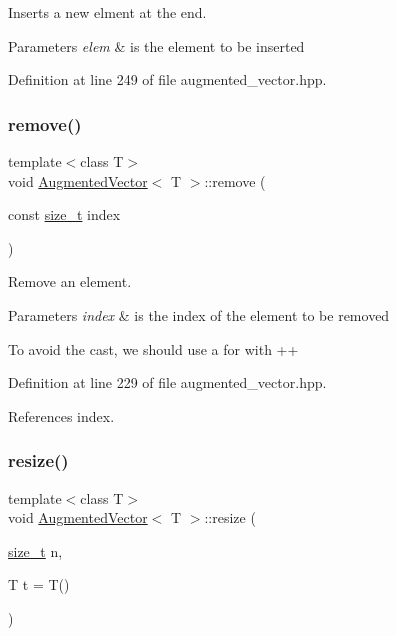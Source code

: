 Inserts a new elment at the end. 


\begin{DoxyParams}{Parameters}
{\em elem} & is the element to be inserted \\
\hline
\end{DoxyParams}


Definition at line 249 of file augmented\+\_\+vector.\+hpp.

\mbox{\label{classAugmentedVector_aaab0ba673a617c1641ce90c9f92d1f0f}} 
\subsubsection{\texorpdfstring{remove()}{remove()}}
{\footnotesize\ttfamily template$<$class T$>$ \\
void \hyperlink{classAugmentedVector}{Augmented\+Vector}$<$ T $>$\+::remove (\begin{DoxyParamCaption}\item[{const \hyperlink{tutorial__fpt__2017_2intro_2sixth_2test_8c_a7c94ea6f8948649f8d181ae55911eeaf}{size\+\_\+t}}]{index }\end{DoxyParamCaption})\hspace{0.3cm}{\ttfamily [inline]}}



Remove an element. 


\begin{DoxyParams}{Parameters}
{\em index} & is the index of the element to be removed \\
\hline
\end{DoxyParams}
To avoid the cast, we should use a for with ++ 

Definition at line 229 of file augmented\+\_\+vector.\+hpp.



References index.

\mbox{\label{classAugmentedVector_ac7bda0c6b6794fd34869116dc5e5538b}} 
\subsubsection{\texorpdfstring{resize()}{resize()}}
{\footnotesize\ttfamily template$<$class T$>$ \\
void \hyperlink{classAugmentedVector}{Augmented\+Vector}$<$ T $>$\+::resize (\begin{DoxyParamCaption}\item[{\hyperlink{tutorial__fpt__2017_2intro_2sixth_2test_8c_a7c94ea6f8948649f8d181ae55911eeaf}{size\+\_\+t}}]{n,  }\item[{T}]{t = {\ttfamily T()} }\end{DoxyParamCaption})\hspace{0.3cm}{\ttfamily [inline]}}



